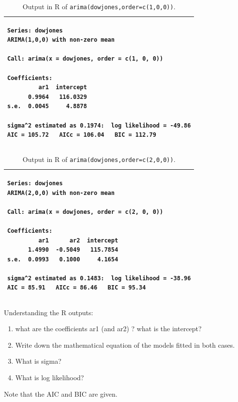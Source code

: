 \documentclass[a4paper,11pt,oneside,onecolumn]{book}
\begin{document}
\begin{table}[!h]
\begin{center}
\begin{tabular}{|p{\linewidth}|}
\hline
\begin{verbatim}
Series: dowjones 
ARIMA(1,0,0) with non-zero mean 

Call: arima(x = dowjones, order = c(1, 0, 0)) 

Coefficients:
         ar1  intercept
      0.9964   116.0329
s.e.  0.0045     4.8878

sigma^2 estimated as 0.1974:  log likelihood = -49.86
AIC = 105.72   AICc = 106.04   BIC = 112.79
\end{verbatim}\\
\hline
\end{tabular}
\caption{Output in R of \texttt{arima(dowjones,order=c(1,0,0))}. }
\label{tab:AR1:ARMA}
\end{center}
\end{table}
\begin{table}[!h]
\begin{center}
\begin{tabular}{|p{\linewidth}|}
\hline
\begin{verbatim}
Series: dowjones 
ARIMA(2,0,0) with non-zero mean 

Call: arima(x = dowjones, order = c(2, 0, 0)) 

Coefficients:
         ar1      ar2  intercept
      1.4990  -0.5049   115.7854
s.e.  0.0993   0.1000     4.1654

sigma^2 estimated as 0.1483:  log likelihood = -38.96
AIC = 85.91   AICc = 86.46   BIC = 95.34
\end{verbatim}\\
\hline
\end{tabular}
\caption{Output in R of \texttt{arima(dowjones,order=c(2,0,0))}. }
\label{tab:AR2:ARMA}
\end{center}
\end{table}


Understanding the R outputs:
\begin{enumerate}
\item what are the coefficients ar1 (and ar2) ? what is the intercept?
\item Write down the mathematical equation of the models fitted in both cases.
\item  What is  sigma?
\item What is log likelihood?
\end{enumerate}
Note that the AIC and BIC are given.
\end{document}
